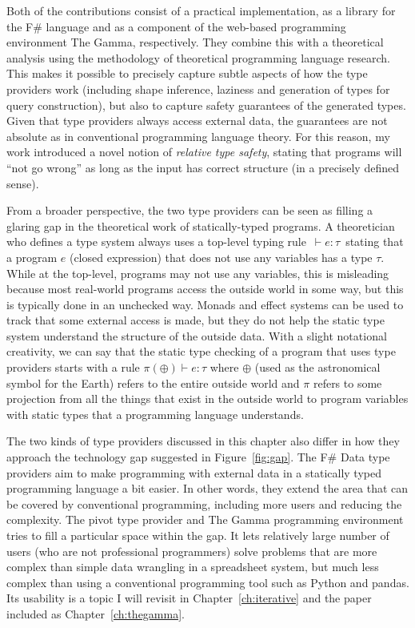\documentclass[fleqn,11pt]{report}
\theoremstyle{definition}
\begin{document}
\noindent
Both of the contributions consist of a practical implementation, as a library for the F\# language and
as a component of the web-based programming environment The Gamma, respectively. They combine this
with a theoretical analysis using the methodology of theoretical programming language research.
This makes it possible to precisely capture subtle aspects of how the type providers work
(including shape inference, laziness and generation of types for query construction), but also
to capture safety guarantees of the generated types. Given that type providers always access
external data, the guarantees are not absolute as in conventional programming language theory.
For this reason, my work introduced a novel notion of \emph{relative type safety}, stating that
programs will ``not go wrong'' as long as the input has correct structure (in a precisely defined
sense).

From a broader perspective, the two type providers can be seen as filling a glaring gap in the
theoretical work of statically-typed programs. A theoretician who defines a type system always uses
a top-level typing rule \,$\vdash\!e\!:\!\tau$\, stating that a program $e$ (closed expression) that
does not use any variables has a type $\tau$. While at the top-level, programs may not use any variables,
this is misleading because most real-world programs access the outside world in some way, but
this is typically done in an unchecked way. Monads and effect systems \citep{lucassen-1988-effects,spj-1993-imperative}
can be used to track that some external access is made, but they do not help the static type
system understand the structure of the outside data.
%
With a slight notational creativity, we can say that the static type checking of a program that
uses type providers starts with a rule $\pi(\oplus) \vdash e\!:\!\tau$ where $\oplus$ (used as the
astronomical symbol for the Earth) refers to the entire outside world and $\pi$ refers
to some projection from all the things that exist in the outside world to program variables
with static types that a programming language understands.

The two kinds of type providers discussed in this chapter also differ in how they approach the
technology gap suggested in Figure~\ref{fig:gap}. The F\# Data type providers aim to make
programming with external data in a statically typed programming language a bit easier.
In other words, they extend the area that can be covered by conventional programming,
including more users and reducing the complexity. The pivot type provider and The Gamma
programming environment tries to fill a particular space within the gap. It lets relatively
large number of users (who are not professional programmers) solve problems that are more complex
than simple data wrangling in a spreadsheet system, but much less complex than using a conventional
programming tool such as Python and pandas. Its usability is a topic I will revisit in
Chapter~\ref{ch:iterative} and the paper included as Chapter~\ref{ch:thegamma}.
\end{document}
